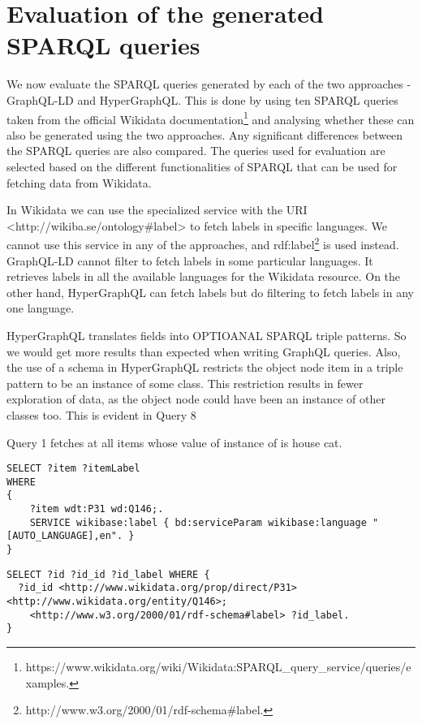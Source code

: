 \chapter{Evaluation of the generated SPARQL queries}

We now evaluate the SPARQL queries generated by each of the two approaches - GraphQL-LD and HyperGraphQL. This is done by using ten SPARQL queries taken from the official Wikidata documentation\footnote{https://www.wikidata.org/wiki/Wikidata:SPARQL\_query\_service/queries/examples.} and analysing whether these can also be generated using the two approaches. Any significant differences between the SPARQL queries are also compared. The queries used for evaluation are selected based on the different functionalities of SPARQL that can be used for fetching data from Wikidata.

In Wikidata we can use the specialized service with the URI <http://wikiba.se/ontology\#label> to fetch labels in specific languages. We cannot use this service in any of the approaches, and rdf:label\footnote{http://www.w3.org/2000/01/rdf-schema\#label.} is used instead. GraphQL-LD cannot filter to fetch labels in some particular languages. It retrieves labels in all the available languages for the Wikidata resource. On the other hand, HyperGraphQL can fetch labels but do filtering to fetch labels in any one language. 

HyperGraphQL translates fields into OPTIOANAL SPARQL triple patterns. So we would get more results than expected when writing GraphQL queries. Also, the use of a schema in HyperGraphQL restricts the object node item in a triple pattern to be an instance of some class. This restriction results in fewer exploration of data, as the object node could have been an instance of other classes too. This is evident in Query 8

Query 1 fetches at all items whose value of instance of is house cat.

\begin{minipage}{\linewidth}
\begin{lstlisting}[label=listing:listing34, caption={Query 1}]
SELECT ?item ?itemLabel
WHERE
{
    ?item wdt:P31 wd:Q146;.
    SERVICE wikibase:label { bd:serviceParam wikibase:language "[AUTO_LANGUAGE],en". }
}
\end{lstlisting}
\end{minipage}


\begin{minipage}{\linewidth}
\begin{lstlisting}[label=listing:listing35, caption={Query 1 - GraphQL-LD}]
SELECT ?id ?id_id ?id_label WHERE {
  ?id_id <http://www.wikidata.org/prop/direct/P31> <http://www.wikidata.org/entity/Q146>;
    <http://www.w3.org/2000/01/rdf-schema#label> ?id_label.
}
\end{lstlisting}
\end{minipage}


